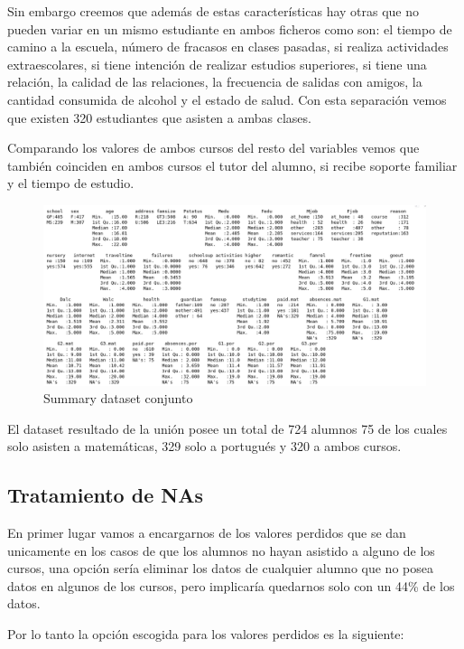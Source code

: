 \documentclass[12pt,a4paper]{article}
\begin{document}
Sin embargo creemos que además de estas características hay otras que no pueden variar en un mismo estudiante en ambos ficheros como son: el tiempo de camino a la escuela, número de fracasos en clases pasadas, si realiza actividades extraescolares, si tiene intención de realizar estudios superiores, si tiene una relación, la calidad de las relaciones, la frecuencia de salidas con amigos, la cantidad consumida de alcohol y el estado de salud. Con esta separación vemos que existen 320 estudiantes que asisten a ambas clases. 

Comparando los valores de ambos cursos del resto del variables vemos que también coinciden en ambos cursos el tutor del alumno, si recibe soporte familiar y el tiempo de estudio. 


 \begin{figure}[ht!]
	\centering
	\includegraphics[trim = 0mm 0mm 0mm 0mm, clip,scale=0.4]{images/summary_inicial}
	\caption{Summary dataset conjunto}
	\label{fig:sum1}
\end{figure}


El dataset resultado de la unión posee un total de 724 alumnos 75 de los cuales solo asisten a matemáticas, 329 solo a portugués y  320 a ambos cursos.


\subsection{Tratamiento de NAs}
En primer lugar vamos a encargarnos de los valores perdidos que se dan unicamente en los casos de que los alumnos no hayan asistido a alguno de los cursos, una opción sería eliminar los datos de cualquier alumno que no posea datos en algunos de los cursos, pero implicaría quedarnos solo con un 44\% de los datos. 


Por lo tanto la opción escogida para los valores perdidos es la siguiente: 
\end{document}
